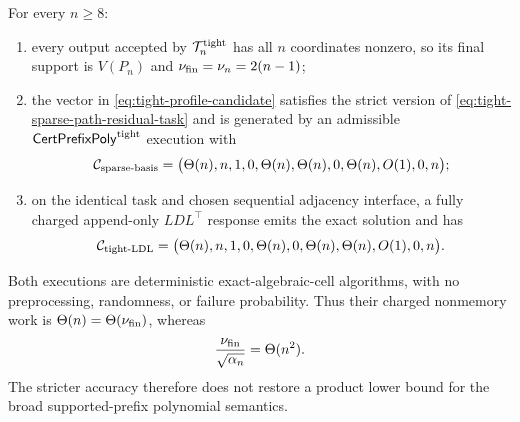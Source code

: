 \begin{theorem}
\label{thm:tight-certificate-sparse-basis-counteralgorithm}
For every $n\geq8$:
\begin{enumerate}[label=(\roman*)]
\item every output accepted by $\mathcal T_n^{\rm tight}$ has all $n$
      coordinates nonzero, so its final support is $V(P_n)$ and
      $\nu_{\rm fin}=\nu_n=2(n-1)$;
\item the vector in \cref{eq:tight-profile-candidate} satisfies the strict
      version of \cref{eq:tight-sparse-path-residual-task} and is generated
      by an admissible $\mathsf{CertPrefixPoly}^{\rm tight}$ execution with
      \begin{equation}
       \mathcal C_{\rm sparse\text{-}basis}=\bigl(
       \Theta(n),n,1,0,\Theta(n),\Theta(n),0,
       \Theta(n),O(1),0,n\bigr);
       \label{eq:tight-sparse-basis-resource-vector}
      \end{equation}
\item on the identical task and chosen sequential adjacency interface, a
      fully charged append-only $LDL^\top$ response emits the exact solution
      and has
      \begin{equation}
       \mathcal C_{\rm tight\text{-}LDL}=\bigl(
       \Theta(n),n,1,0,\Theta(n),0,\Theta(n),
       \Theta(n),O(1),0,n\bigr).
       \label{eq:tight-path-response-resource-vector}
      \end{equation}
\end{enumerate}
Both executions are deterministic exact-algebraic-cell algorithms, with no
preprocessing, randomness, or failure probability.  Thus their charged
nonmemory work is
$\Theta(n)=\Theta(\nu_{\rm fin})$, whereas
\begin{equation}
 \frac{\nu_{\rm fin}}{\sqrt{\alpha_n}}=\Theta(n^2).
 \label{eq:tight-path-product-refutation}
\end{equation}
The stricter accuracy therefore does not restore a product lower bound for
the broad supported-prefix polynomial semantics.
\end{theorem}

